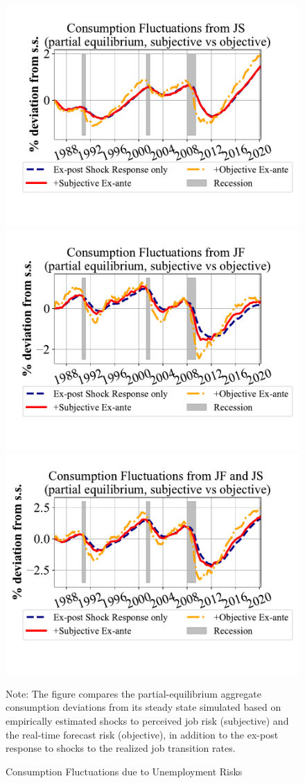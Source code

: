 \begin{figure}[ht]
    \centering
    \caption{Consumption Fluctuations due to Unemployment Risks}
    \label{fig:pe_decompose_sub_obj}
\includegraphics[width=0.6\linewidth]{text/chapter2/Figures/consumption_pe_JS_deviation_machine_as_rational.pdf} \\
\vspace{-2em}
\includegraphics[width=0.6\linewidth]{text/chapter2/Figures/consumption_pe_JF_deviation_machine_as_rational.pdf} \\
\vspace{-2em}
\includegraphics[width=0.6\linewidth]{text/chapter2/Figures/consumption_pe_JS_JF_deviation_machine_as_rational.pdf} \\
	\begin{flushleft}\footnotesize {Note: The figure compares the partial-equilibrium aggregate consumption deviations from its steady state simulated based on empirically estimated shocks to perceived job risk (subjective) and the real-time forecast risk (objective), in addition to the ex-post response to shocks to the realized job transition rates.} \end{flushleft}
\end{figure}


